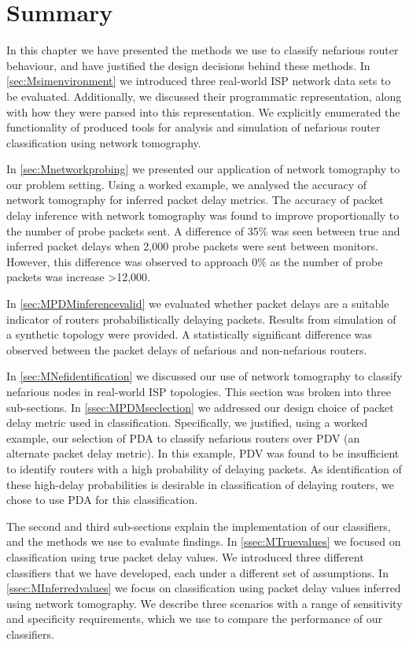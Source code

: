 \section{Summary}
In this chapter we have presented the methods we use to classify nefarious router behaviour, and have justified the design decisions behind these methods. In \cref{sec:Msimenvironment} we introduced three real-world ISP network data sets to be evaluated. Additionally, we discussed their programmatic representation, along with how they were parsed into this representation. We explicitly enumerated the functionality of produced tools for analysis and simulation of nefarious router classification using network tomography.\par
In \cref{sec:Mnetworkprobing} we presented our application of network tomography to our problem setting. Using a worked example, we analysed the accuracy of network tomography for inferred packet delay metrics. The accuracy of packet delay inference with network tomography was found to improve proportionally to the number of probe packets sent. A difference of 35\% was seen between true and inferred packet delays when 2,000 probe packets were sent between monitors. However, this difference was observed to approach 0\% as the number of probe packets was increase >12,000.\par
In \cref{sec:MPDMinferencevalid} we evaluated whether packet delays are a suitable indicator of routers probabilistically delaying packets. Results from simulation of a synthetic topology were provided. A statistically significant difference was observed between the packet delays of nefarious and non-nefarious routers.\par
In \cref{sec:MNefidentification} we discussed our use of network tomography to classify nefarious nodes in real-world ISP topologies. This section was broken into three sub-sections. In \cref{ssec:MPDMseclection} we addressed our design choice of packet delay metric used in classification. Specifically, we justified, using a worked example, our selection of PDA to classify nefarious routers over PDV (an alternate packet delay metric). In this example, PDV was found to be insufficient to identify routers with a high probability of delaying packets. As identification of these high-delay probabilities is desirable in classification of delaying routers, we chose to use PDA for this classification.\par
The second and third sub-sections explain the implementation of our classifiers, and the methods we use to evaluate findings. In \cref{ssec:MTruevalues} we focused on classification using true packet delay values. We introduced three different classifiers that we have developed, each under a different set of assumptions. In \cref{ssec:MInferredvalues} we focus on classification using packet delay values inferred using network tomography. We describe three scenarios with a range of sensitivity and specificity requirements, which we use to compare the performance of our classifiers.\par
